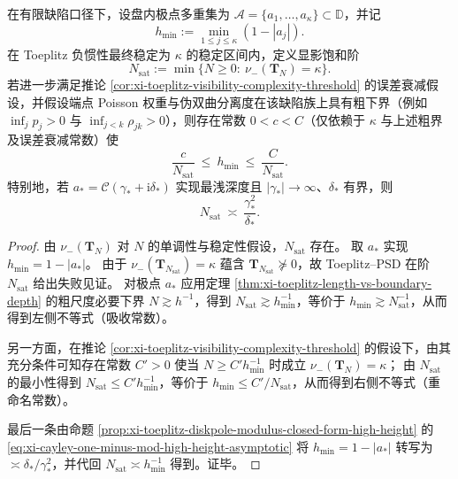 \begin{corollary}[显影饱和阶与最浅深度的同阶性]\label{cor:xi-toeplitz-saturation-index-comparable-to-shallowest-depth}
在有限缺陷口径下，设盘内极点多重集为 \(\mathcal A=\{a_1,\dots,a_\kappa\}\subset\mathbb{D}\)，并记
\[
h_{\min}:=\min_{1\le j\le \kappa}(1-|a_j|).
\]
在 Toeplitz 负惯性最终稳定为 \(\kappa\) 的稳定区间内，定义显影饱和阶
\[
N_{\mathrm{sat}}:=\min\{N\ge 0:\ \nu_-(\mathbf{T}_N)=\kappa\}.
\]
若进一步满足推论 \ref{cor:xi-toeplitz-visibility-complexity-threshold} 的误差衰减假设，并假设端点 Poisson 权重与伪双曲分离度在该缺陷族上具有粗下界（例如 \(\inf_j p_j>0\) 与 \(\inf_{j<k}\rho_{jk}>0\)），则存在常数 \(0<c<C\)（仅依赖于 \(\kappa\) 与上述粗界及误差衰减常数）使
\[
\frac{c}{N_{\mathrm{sat}}}\ \le\ h_{\min}\ \le\ \frac{C}{N_{\mathrm{sat}}}.
\]
特别地，若 \(a_\ast=\mathcal{C}(\gamma_\ast+\mathrm{i}\delta_\ast)\) 实现最浅深度且 \(|\gamma_\ast|\to\infty\)、\(\delta_\ast\) 有界，则
\[
N_{\mathrm{sat}}\ \asymp\ \frac{\gamma_\ast^2}{\delta_\ast}.
\]
\end{corollary}
\begin{proof}
由 \(\nu_-(\mathbf{T}_N)\) 对 \(N\) 的单调性与稳定性假设，\(N_{\mathrm{sat}}\) 存在。
取 \(a_\ast\) 实现 \(h_{\min}=1-|a_\ast|\)。
由于 \(\nu_-(\mathbf{T}_{N_{\mathrm{sat}}})=\kappa\) 蕴含 \(\mathbf{T}_{N_{\mathrm{sat}}}\nsucceq 0\)，故 Toeplitz--PSD 在阶 \(N_{\mathrm{sat}}\) 给出失败见证。
对极点 \(a_\ast\) 应用定理 \ref{thm:xi-toeplitz-length-vs-boundary-depth} 的粗尺度必要下界 \(N\gtrsim h^{-1}\)，得到
\(
N_{\mathrm{sat}}\gtrsim h_{\min}^{-1}
\)，等价于 \(h_{\min}\gtrsim N_{\mathrm{sat}}^{-1}\)，从而得到左侧不等式（吸收常数）。
\par
另一方面，在推论 \ref{cor:xi-toeplitz-visibility-complexity-threshold} 的假设下，由其充分条件可知存在常数 \(C'>0\) 使当 \(N\ge C'h_{\min}^{-1}\) 时成立 \(\nu_-(\mathbf{T}_N)=\kappa\)；
由 \(N_{\mathrm{sat}}\) 的最小性得到 \(N_{\mathrm{sat}}\le C'h_{\min}^{-1}\)，等价于 \(h_{\min}\le C'/N_{\mathrm{sat}}\)，从而得到右侧不等式（重命名常数）。
\par
最后一条由命题 \ref{prop:xi-toeplitz-diskpole-modulus-closed-form-high-height} 的 \eqref{eq:xi-cayley-one-minus-mod-high-height-asymptotic} 将 \(h_{\min}=1-|a_\ast|\) 转写为 \(\asymp \delta_\ast/\gamma_\ast^2\)，并代回 \(N_{\mathrm{sat}}\asymp h_{\min}^{-1}\) 得到。证毕。
\end{proof}

\endinput
